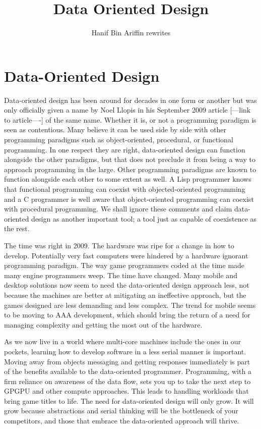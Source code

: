 \documentclass[a4paper,12pt]{book}
\author{Hanif Bin Ariffin rewrites}
\title{Data Oriented Design}
\begin{document}
\maketitle
\tableofcontents

\newpage
\section{Data-Oriented Design}

Data-oriented design has been around for decades in one form or another but was only officially given a name by Noel Llopis in his September 2009 article [---link to article----] of the same name.
Whether it is, or not a programming paradigm is seen as contentious.
Many believe it can be used side by side with other programming paradigms such as object-oriented, procedural, or functional programming.
In one respect they are right, data-oriented design can function alongside the other paradigms, but that does not preclude it from being a way to approach programming in the large.
Other programming paradigms are known to function alongside each other to some extent as well.
A Lisp programmer knows that functional programming can coexist with objected-oriented programming and a C programmer is well aware that object-oriented programming can coexist with procedural programming.
We shall ignore these comments and claim data-oriented design as another important tool;
a tool just as capable of coexistence as the rest.

The time was right in 2009.
The hardware was ripe for a change in how to develop.
Potentially very fast computers were hindered by a hardware ignorant programming paradigm.
The way game programmers coded at the time made many engine programmers weep.
The time have changed.
Many mobile and desktop solutions now seem to need the data-oriented design approach less, not because the machines are better at mitigating an ineffective approach, but the games designed are less demanding and less complex.
The trend for mobile seems to be moving to AAA development, which should bring the return of a need for managing complexity and getting the most out of the hardware.

As we now live in a world where multi-core machines include the ones in our pockets, learning how to develop software in a less serial manner is important.
Moving away from objects messaging and getting responses immediately is part of the benefits available to the data-oriented programmer.
Programming, with a firm reliance on awareness of the data flow, sets you up to take the next step to GPGPU and other compute approaches.
This leads to handling workloads that bring game titles to life.
The need for data-oriented design will only grow.
It will grow because abstractions and serial thinking will be the bottleneck of your competitors, and those that embrace the data-oriented approach will thrive.
\end{document}
